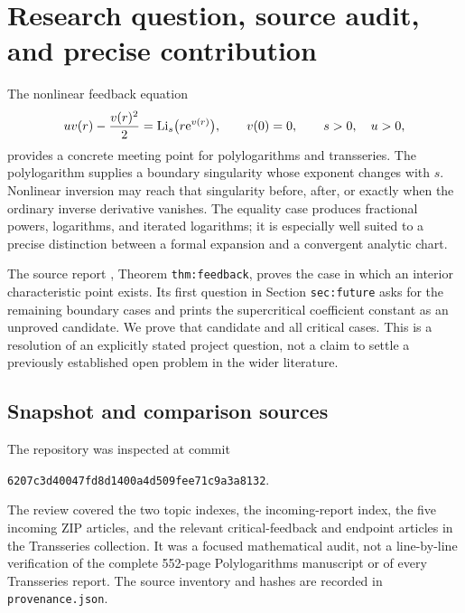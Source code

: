 \section{Research question, source audit, and precise contribution}
\label{sec:scope}

The nonlinear feedback equation
\begin{equation}\label{eq:model}
 uv(r)-\frac{v(r)^2}{2}=\operatorname{Li}_s\bigl(r\mathrm e^{v(r)}\bigr),
 \qquad v(0)=0,\qquad s>0,\quad u>0,
\end{equation}
provides a concrete meeting point for polylogarithms and transseries.
The polylogarithm supplies a boundary singularity whose exponent changes
with $s$.  Nonlinear inversion may reach that singularity before, after,
or exactly when the ordinary inverse derivative vanishes.  The equality
case produces fractional powers, logarithms, and iterated logarithms;
it is especially well suited to a precise distinction between a formal
expansion and a convergent analytic chart.

The source report \cite{RepoFeedback}, Theorem \texttt{thm:feedback},
proves the case in which an interior characteristic point exists.
Its first question in Section \texttt{sec:future} asks for the remaining
boundary cases and prints the supercritical coefficient constant as an
unproved candidate.  We prove that candidate and all critical cases.
This is a resolution of an explicitly stated project question, not a
claim to settle a previously established open problem in the wider
literature.

\subsection{Snapshot and comparison sources}

The repository was inspected at commit
\begin{center}
\small\texttt{6207c3d40047fd8d1400a4d509fee71c9a3a8132}.
\end{center}
The review covered the two topic indexes, the incoming-report index,
the five incoming ZIP articles, and the relevant critical-feedback
and endpoint articles in the Transseries collection.  It was a focused
mathematical audit, not a line-by-line verification of the complete
552-page Polylogarithms manuscript or of every Transseries report.
The source inventory and hashes are recorded in \texttt{provenance.json}.

